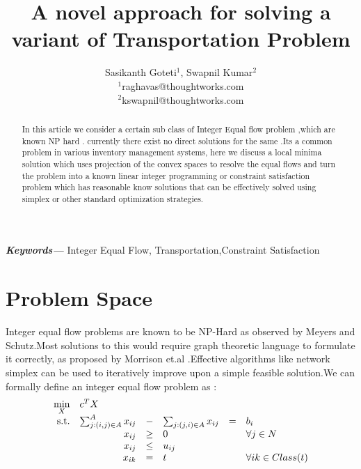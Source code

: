 \documentclass[a4paper]{article}
\title{A novel approach for solving a variant of Transportation Problem}
\author{Sasikanth Goteti$^{1}$, Swapnil Kumar$^{2}$  \\
            \small $^{1}$raghavas@thoughtworks.com \\
            \small $^{2}$kswapnil@thoughtworks.com \\
    }
\date{} %
\providecommand{\keywords}[1]
    {
      \small	
      \textbf{\textit{Keywords---}} #1
    }
\begin{document}
    \maketitle
    
    \begin{abstract}
        In this article we consider a certain sub class of Integer Equal flow problem ,which are known NP hard \cite{meyers}. 
        currently there exist no direct solutions for the same .Its a common problem in various inventory management systems,
        here we discuss a local minima solution which uses projection of the convex spaces to resolve the equal flows and turn 
        the problem into a known linear integer programming or constraint satisfaction problem which has reasonable know solutions that can be 
        effectively solved using simplex or other standard optimization strategies.
       \end{abstract}
    \keywords{Integer Equal Flow, Transportation,Constraint Satisfaction}
     
    \maketitle
    
    \section{Problem Space}
    Integer equal flow problems are known to be NP-Hard as observed by Meyers and Schutz\cite{meyers}.Most solutions to this would
    require graph theoretic language to formulate it correctly, as proposed by Morrison et.al \cite{Morrison2013ANS}.Effective
    algorithms like network simplex can be used to iteratively improve upon a simple feasible solution.We can formally define an
    integer equal flow problem as :
    \begin{equation}
        \begin{array}{rrclcl}
        \displaystyle \min_{X} & \multicolumn{3}{l}{c^T X} \\
        \textrm{s.t.} & \sum_{j:(i,j) \in A }^A x_{ij} & - & \sum_{j:(j,i) \in A } x_{ij} & = & b_i \\
        & x_{ij} & \geq & 0 & & \forall j \in N \\
        & x_{ij} & \leq & u_{ij} \\
        & x_{ik} &= & t && \forall {ik}\in Class(t)
        \end{array}
        \end{equation}
\end{document}
